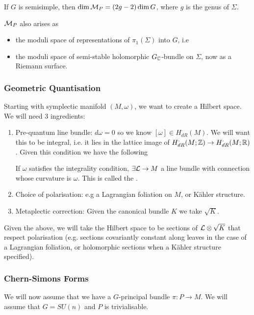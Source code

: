 \documentclass{article}
\begin{document}
\begin{example}
	If $G$ is semisimple, then $\dim \mathcal{M}_P = (2g-2)\dim G$, where $g$ is the genus of $\Sigma$.  
\end{example}

\begin{remark}
	$\mathcal{M}_P$ also arises as 
	\begin{itemize}
		\item the moduli space of representations of $\pi_1(\Sigma)$ into $G$, i.e 
\item the moduli space of semi-stable holomorphic $G_{\mathbb{C}}$-bundle on $\Sigma$, now as a Riemann surface. 
	\end{itemize}
\end{remark}

\subsubsection{Geometric Quantisation}
Starting with symplectic manifold $(M,\omega)$, we want to create a Hilbert space. We will need 3 ingredients:
\begin{enumerate}
	\item Pre-quantum line bundle: $d\omega=0$ so we know $[\omega] \in H^\cdot_{dR}(M)$. We will want this to be integral, i.e. it lies in the lattice image of $H^\cdot_{dR}(M;\mathbb{Z}) \to H^\cdot_{dR}(M;\mathbb{R})$. Given this condition we have the following
	\begin{lemma}
		If $\omega$ satisfies the integrality condition, $\exists \mathcal{L}\to M$ a line bundle with connection whose curvature is $\omega$. This is called the . 
	\end{lemma}
\item Choice of polarisation: e.g a Lagrangian foliation on $M$, or K\"ahler structure. 
\item Metaplectic correction: Given the canonical bundle $K$ we take $\sqrt{K}$. 
\end{enumerate}
Given the above, we will take the Hilbert space to be sections of $\mathcal{L} \otimes \sqrt{K}$ that respect polarisation (e.g. sections covariantly constant along leaves in the case of a Lagrangian foliation, or holomorphic sections when a K\"ahler structure specified).

\subsubsection{Chern-Simons Forms}
We will now assume that we have a $G$-principal bundle $\pi : P\to M$. We will assume that $G=SU(n)$ and $P$ is trivialisable. 
\end{document}
